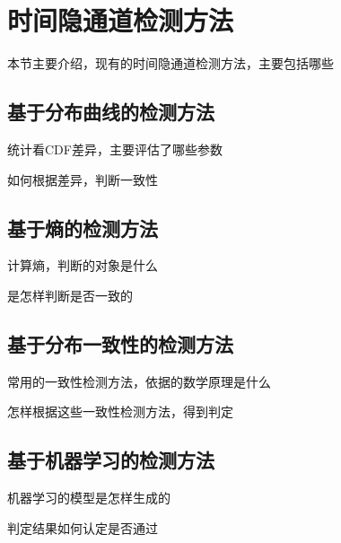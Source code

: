 \section{时间隐通道检测方法}
\label{chap:backinfo:detect}

本节主要介绍，现有的时间隐通道检测方法，主要包括哪些

\subsection{基于分布曲线的检测方法}
\label{chap:backinfo:detect：statistical}

统计看CDF差异，主要评估了哪些参数

如何根据差异，判断一致性

\subsection{基于熵的检测方法}
\label{chap:backinfo:detect:entropy}

计算熵，判断的对象是什么

是怎样判断是否一致的

\subsection{基于分布一致性的检测方法}
\label{chap:backinfo:detect:distribution}

常用的一致性检测方法，依据的数学原理是什么

怎样根据这些一致性检测方法，得到判定

\subsection{基于机器学习的检测方法}
\label{chap:backinfo:detect:machine}

机器学习的模型是怎样生成的

判定结果如何认定是否通过
